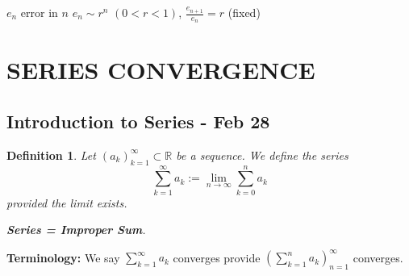 \documentclass[12pt]{article}
\theoremstyle{plain}
\newtheorem{definition}{Definition}[subsection]
\newcommand{\mR}{{\mathbb{R}}}
\begin{document}
$e_n$ error in $n$ $e_n \sim r^n$ $(0 < r < 1)$, $\frac{e_{n+1}}{e_n} = r$
(fixed) 



\newpage
\section{SERIES CONVERGENCE}
\subsection{Introduction to Series - Feb 28}
\begin{definition}
	Let $(a_k)_{k=1}^{\infty} \subset \mR$ be a sequence. We define the series
	\[
		\sum_{k=1}^{\infty} a_k := \lim_{n\to\infty} \sum_{k=0}^n a_k
	\]
	provided the limit exists. 

	\textbf{Series = Improper Sum}. 
\end{definition}

\textbf{Terminology:} We say $\sum_{k=1}^{\infty} a_k$ converges provide
$(\sum_{k=1}^n a_k)_{n=1}^{\infty}$ converges.\\
\end{document}
